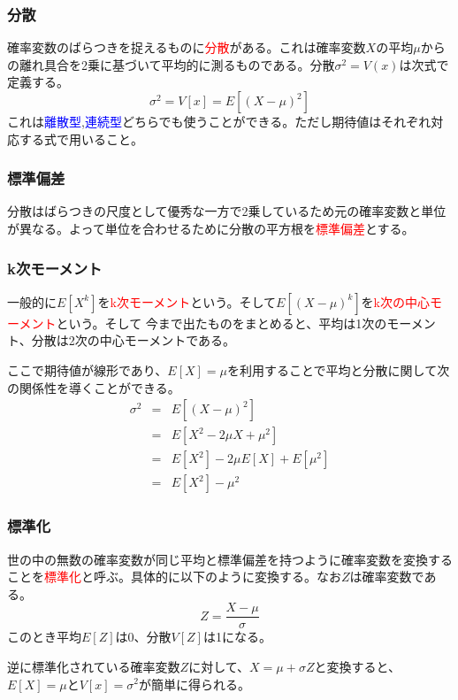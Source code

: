 \documentclass[a4paper,10pt]{jarticle}
\begin{document}
\subsubsection{分散}
確率変数のばらつきを捉えるものに\textcolor{red}{分散}がある。これは確率変数$X$の平均$\mu$からの離れ具合を2乗に基づいて平均的に測るものである。分散$\sigma^2=V(x)$は次式で定義する。
\begin{equation}
    \sigma^2=V[x]=E[(X-\mu)^2]\tag{2,12}
\end{equation}
これは\textcolor{blue}{離散型},\textcolor{blue}{連続型}どちらでも使うことができる。ただし期待値はそれぞれ対応する式で用いること。

\subsubsection{標準偏差}
分散はばらつきの尺度として優秀な一方で2乗しているため元の確率変数と単位が異なる。よって単位を合わせるために分散の平方根を\textcolor{red}{標準偏差}とする。
\subsubsection{k次モーメント}
一般的に$E[X^k]$を\textcolor{red}{k次モーメント}という。そして$E[(X-\mu)^k]$を\textcolor{red}{k次の中心モーメント}という。そして
今まで出たものをまとめると、平均は1次のモーメント、分散は2次の中心モーメントである。

ここで期待値が線形であり、$E[X]=\mu$を利用することで平均と分散に関して次の関係性を導くことができる。
\begin{eqnarray*}
    \sigma^2 &=& E[(X-\mu)^2]\\
    &=& E[X^2-2\mu X +\mu^2]\\
    &=& E[X^2]-2\mu E[X]+E[\mu^2]\\
    &=& E[X^2]-\mu^2
\end{eqnarray*}
\subsubsection{標準化}
世の中の無数の確率変数が同じ平均と標準偏差を持つように確率変数を変換することを\textcolor{red}{標準化}と呼ぶ。具体的に以下のように変換する。なお$Z$は確率変数である。
\begin{equation}
    Z=\frac{X-\mu}{\sigma}\tag{2,13}
\end{equation}
このとき平均$E[Z]$は0、分散$V[Z]$は1になる。

逆に標準化されている確率変数$Z$に対して、$X=\mu+\sigma Z$と変換すると、$E[X]=\mu$と$V[x]=\sigma^2$が簡単に得られる。
\end{document}
